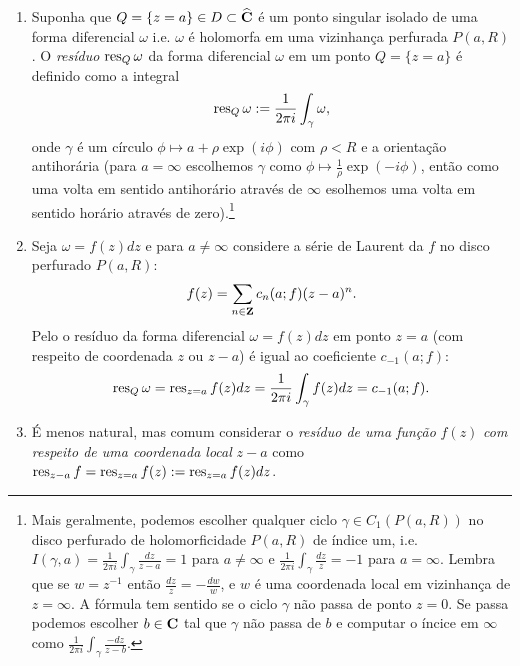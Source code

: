 \begin{defin}
\begin{enumerate}
\item Suponha que $Q = \{ z = a \} \in D \subset \widehat{\mathbf{C}}$ é um ponto singular isolado de uma forma diferencial $\omega$
i.e. $\omega$ é holomorfa em uma vizinhança perfurada $P(a,R)$.
O \emph{resíduo} $\operatorname{res}_Q \omega$ da forma diferencial $\omega$ em um ponto $Q = \{ z = a \}$
é definido como a integral
\begin{equation}
\operatorname{res}_Q \omega := \frac{1}{2\pi i} \int_\gamma \omega,
\end{equation}
onde $\gamma$ é um círculo $\phi \mapsto a + \rho \exp(i\phi)$ com $\rho<R$ e a orientação antihorária
(para $a=\infty$ escolhemos $\gamma$
como $\phi \mapsto \frac{1}{\rho} \exp(-i\phi)$,
então como uma volta em sentido antihorário através de $\infty$
esolhemos uma volta em sentido horário através de zero).\footnote{
Mais geralmente, podemos escolher qualquer ciclo $\gamma \in C_1(P(a,R))$
no disco perfurado de holomorficidade $P(a,R)$
de índice um, i.e.
$I(\gamma,a) = \frac{1}{2\pi i} \int_\gamma \frac{dz}{z-a} = 1$ para $a\neq\infty$
e $\frac{1}{2\pi i} \int_\gamma \frac{dz}{z} = -1$ para $a=\infty$. Lembra que
se $w=z^{-1}$ então $\frac{dz}{z} = -\frac{dw}{w}$,
e $w$ é uma coordenada local em vizinhança de $z=\infty$.
A fórmula tem sentido se o ciclo $\gamma$ não passa de ponto $z=0$.
Se passa podemos escolher $b\in\mathbf{C}$ tal que $\gamma$ não passa de $b$
e computar o íncice em $\infty$ como $\frac{1}{2\pi i} \int_\gamma \frac{-dz}{z-b}$.}
\item Seja $\omega = f(z) dz$ e para $a\neq\infty$
considere a série de Laurent da $f$ no disco perfurado $P(a,R)$:
\[ f(z) = \sum_{n\in\mathbf{Z}} c_n(a;f) (z-a)^n. \]
Pelo  o  resíduo da forma diferencial
$\omega = f(z) dz$ em ponto $z=a$ (com respeito de coordenada $z$ ou $z-a$)
é igual ao coeficiente $c_{-1}(a;f)$:
\begin{equation}
\operatorname{res}_Q \omega = \operatorname{res}_{z=a} f(z) dz =\frac{1}{2\pi i} \int_\gamma f(z) dz = c_{-1}(a;f).
\end{equation}
\item É menos natural, mas comum considerar o \emph{resíduo de uma função} $f(z)$
\emph{com respeito de uma coordenada local} $z-a$ como $\operatorname{res}_{z-a} f = \operatorname{res}_{z=a} f(z) := \operatorname{res}_{z=a} f(z) dz$.
\end{enumerate}
\end{defin}

